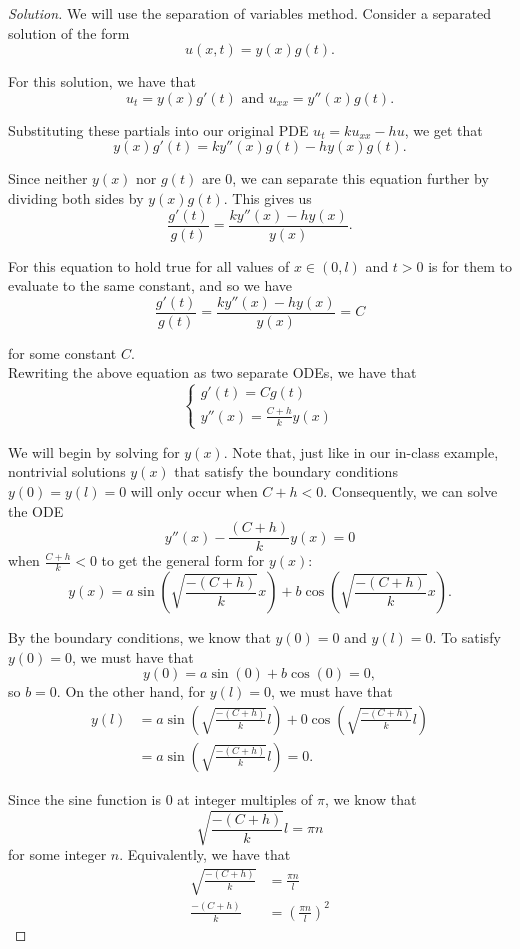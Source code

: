 \documentclass[11pt]{article}
\newenvironment{solution}
  {\renewcommand\qedsymbol{$\blacksquare$}\begin{proof}[Solution]}
  {\end{proof}}
\begin{document}
\begin{solution}
We will use the separation of variables method. Consider a separated solution of the form \[u(x, t) = y(x) g(t).\]

For this solution, we have that \[ u_t = y(x)g'(t) \text{ and } u_{xx} = y''(x) g(t).\]

Substituting these partials into our original PDE $u_t = ku_{xx} - hu$, we get that
\[ y(x)g'(t) = ky''(x)g(t) - hy(x)g(t).\]

Since neither $y(x)$ nor $g(t)$ are $0$, we can separate this equation further by dividing both sides by $y(x)g(t)$. This gives us
\[ \frac{g'(t)}{g(t)} = \frac{ky''(x) -hy(x)}{y(x)}.\]

For this equation to hold true for all values of $x \in (0, l)$ and $t>0$ is for them to evaluate to the same constant, and so we have
\[ \frac{g'(t)}{g(t)} = \frac{ky''(x) -hy(x)}{y(x)} = C\]

for some constant $C$. \\

Rewriting the above equation as two separate ODEs, we have that
\[
\begin{cases}
  g'(t) = Cg(t) \\
  y''(x) = \frac{C+h}{k}y(x)
\end{cases}
\]

We will begin by solving for $y(x).$ Note that, just like in our in-class example, nontrivial solutions $y(x)$ that satisfy the boundary conditions $y(0)=y(l) = 0$ will only occur when $C+h < 0$. Consequently, we can solve the ODE 
\[ y''(x) - \frac{(C+h)}{k}y(x) = 0\] when $\frac{C+h}{k} < 0$ to get the general form for $y(x)$: 
\[ y(x) = a\sin\left(\sqrt{\frac{-(C+h)}{k}}x\right) + b\cos\left(\sqrt{\frac{-(C+h)}{k}}x\right).\]

By the boundary conditions, we know that $y(0) = 0$ and $y(l) = 0.$ To satisfy $y(0) = 0$, we must have that
\[ y(0) = a\sin(0) + b\cos(0) = 0, \]
so $b = 0$. On the other hand, for $y(l) = 0$, we must have that
\begin{align*}y(l)&= a\sin\left(\sqrt{\frac{-(C+h)}{k}}l\right) + 0\cos\left(\sqrt{\frac{-(C+h)}{k}}l\right) \\
&= a\sin\left(\sqrt{\frac{-(C+h)}{k}}l\right) = 0.
\end{align*}

Since the sine function is $0$ at integer multiples of $\pi$, we know that \[\sqrt{\frac{-(C+h)}{k}}l = \pi n \] for some integer $n$. Equivalently, we have that 
\begin{align*}\sqrt{\frac{-(C+h)}{k}} &= \frac{\pi n}{l} \\
\frac{-(C+h)}{k} &= \left( \frac{\pi n}{l} \right)^2 \end{align*}


\end{solution}
\end{document}
